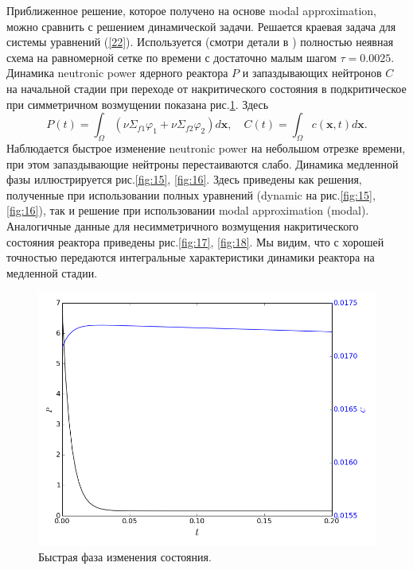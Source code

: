 \documentclass[authoryear]{elsarticle}
\begin{document}
Приближенное решение, которое получено на основе modal approximation,
можно сравнить с решением динамической задачи.
Решается краевая задача для системы уравнений (\ref{22}).
Используется (смотри детали в \cite{nd-mm}) полностью неявная схема
на равномерной сетке по времени с достаточно малым шагом $\tau = 0.0025$.
Динамика neutronic power ядерного реактора $P$ и запаздывающих нейтронов $C$ 
на начальной стадии при переходе от накритического состояния в подкритическое при
симметричном возмущении показана рис.\ref{fig:14}. 
Здесь 
\[
 P(t) = \int_{\Omega} (\nu\Sigma_{f1} \varphi_1 + \nu\Sigma_{f2} \varphi_2)  d \bm x,
 \quad C(t) = \int_{\Omega} c(\bm x,t) d \bm x.
\] 
Наблюдается быстрое изменение neutronic power на небольшом отрезке времени, 
при этом запаздывающие нейтроны перестаиваются слабо.
Динамика медленной фазы иллюстрируется рис.\ref{fig:15}, \ref{fig:16}. 
Здесь приведены как решения, полученные при использовании полных уравнений (dynamic на рис.\ref{fig:15}, \ref{fig:16}),
так и решение при использовании modal approximation (modal).
Аналогичные данные для несимметричного возмущения накритического состояния реактора приведены
 рис.\ref{fig:17}, \ref{fig:18}. 
Мы видим, что с хорошей точностью передаются интегральные характеристики динамики реактора
на медленной стадии.

\begin{figure}[!h]
  \begin{center}
    \includegraphics[width=0.9\linewidth] {14.png}
	\caption{Быстрая фаза изменения состояния.}
	\label{fig:14}
  \end{center}
\end{figure} 
\end{document}
